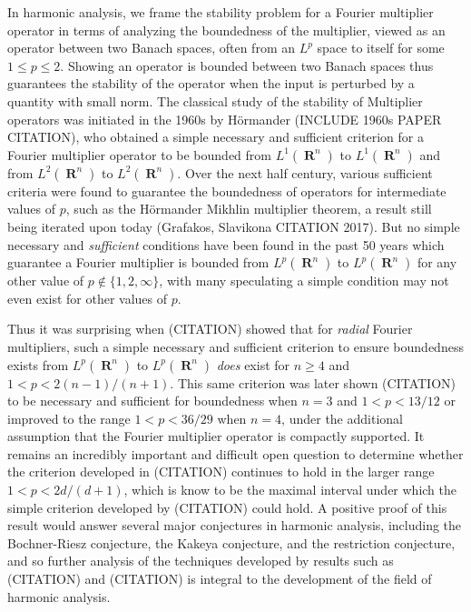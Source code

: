 \documentclass[12pt]{article}
\DeclareMathOperator{\RR}{\mathbf{R}}
\theoremstyle{plain}
\theoremstyle{remark}
\theoremstyle{definition}
\begin{document}
In harmonic analysis, we frame the stability problem for a Fourier multiplier operator in terms of analyzing the boundedness of the multiplier, viewed as an operator between two Banach spaces, often from an $L^p$ space to itself for some $1 \leq p \leq 2$. Showing an operator is bounded between two Banach spaces thus guarantees the stability of the operator when the input is perturbed by a quantity with small norm. The classical study of the stability of Multiplier operators was initiated in the 1960s by H\"{o}rmander (INCLUDE 1960s PAPER CITATION), who obtained a simple necessary and sufficient criterion for a Fourier multiplier operator to be bounded from $L^1(\RR^n)$ to $L^1(\RR^n)$ and from $L^2(\RR^n)$ to $L^2(\RR^n)$. Over the next half century, various sufficient criteria were found to guarantee the boundedness of operators for intermediate values of $p$, such as the H\"{o}rmander Mikhlin multiplier theorem, a result still being iterated upon today (Grafakos, Slavikona CITATION 2017). But no simple necessary and \emph{sufficient} conditions have been found in the past 50 years which guarantee a Fourier multiplier is bounded from $L^p(\RR^n)$ to $L^p(\RR^n)$ for any other value of $p \not \in \{ 1, 2, \infty \}$, with many speculating a simple condition may not even exist for other values of $p$.

Thus it was surprising when (CITATION) showed that for \emph{radial} Fourier multipliers, such a simple necessary and sufficient criterion to ensure boundedness exists from $L^p(\RR^n)$ to $L^p(\RR^n)$ \emph{does} exist for $n \geq 4$ and $1 < p < 2(n-1)/(n+1)$. This same criterion was later shown (CITATION) to be necessary and sufficient for boundedness when $n = 3$ and $1 < p < 13/12$ or improved to the range $1 < p < 36/29$ when $n = 4$, under the additional assumption that the Fourier multiplier operator is compactly supported. It remains an incredibly important and difficult open question to determine whether the criterion developed in (CITATION) continues to hold in the larger range $1 < p < 2d/(d+1)$, which is know to be the maximal interval under which the simple criterion developed by (CITATION) could hold. A positive proof of this result would answer several major conjectures in harmonic analysis, including the Bochner-Riesz conjecture, the Kakeya conjecture, and the restriction conjecture, and so further analysis of the techniques developed by results such as (CITATION) and (CITATION) is integral to the development of the field of harmonic analysis.
\end{document}
